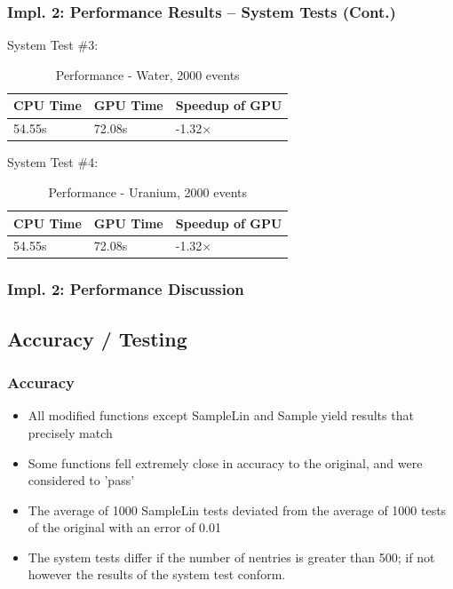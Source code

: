 \documentclass{beamer}
\begin{document}
\begin{frame}
\frametitle{Impl. 2: Performance Results -- System Tests (Cont.)}
System Test \#3:
\begin{table}
	\begin{tabular}{lll}
	\toprule
	\bf CPU Time&\bf  GPU Time&\bf Speedup of GPU\\\midrule
	54.55s&72.08s&-1.32$\times$\\\bottomrule
	\end{tabular}
	\caption{Performance - Water, 2000 events}
\end{table}
System Test \#4:
\begin{table}
	\begin{tabular}{lll}
	\toprule
	\bf CPU Time&\bf  GPU Time&\bf Speedup of GPU\\\midrule
	54.55s&72.08s&-1.32$\times$\\\bottomrule
	\end{tabular}
	\caption{Performance - Uranium, 2000 events}
\end{table}
\end{frame}

\begin{frame}
\frametitle{Impl. 2: Performance Discussion}
\end{frame}

\subsection{Accuracy / Testing}
\begin{frame}
\frametitle{Accuracy}
\begin{itemize}
\item All modified functions except SampleLin and Sample
yield results that precisely match 
\end{itemize}
\begin{itemize}
\item Some functions fell extremely close in accuracy to 
the original, and were considered to 'pass'
\item The average of 1000 SampleLin tests deviated from the 
average of 1000 tests of the original with an error of 0.01 
\end{itemize}
\begin{itemize}
\item The system tests differ if the number of nentries is 
greater than 500; if not however the results of the system 
test conform.
\end{itemize}
\end{frame}
\end{document}
